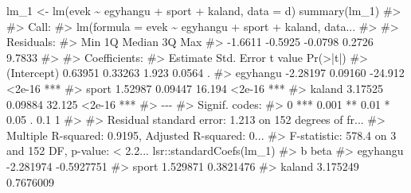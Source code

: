 \documentclass[
  letterpaper,
]{krantz}
\makeatletter
\newenvironment{Shaded}{\begin{snugshade}}{\end{snugshade}}
\newcommand{\AttributeTok}[1]{\textcolor[rgb]{0.40,0.45,0.13}{#1}}
\newcommand{\CommentTok}[1]{\textcolor[rgb]{0.37,0.37,0.37}{#1}}
\newcommand{\FunctionTok}[1]{\textcolor[rgb]{0.28,0.35,0.67}{#1}}
\newcommand{\NormalTok}[1]{\textcolor[rgb]{0.00,0.23,0.31}{#1}}
\newcommand{\OtherTok}[1]{\textcolor[rgb]{0.00,0.23,0.31}{#1}}
\newcommand{\SpecialCharTok}[1]{\textcolor[rgb]{0.37,0.37,0.37}{#1}}
\newenvironment{kframe}{%
\medskip{}
\setlength{\fboxsep}{.8em}
 \def\at@end@of@kframe{}%
 \ifinner\ifhmode%
  \def\at@end@of@kframe{\end{minipage}}%
  \begin{minipage}{\columnwidth}%
 \fi\fi%
 \def\FrameCommand##1{\hskip\@totalleftmargin \hskip-\fboxsep
 \colorbox{shadecolor}{##1}\hskip-\fboxsep
     \hskip-\linewidth \hskip-\@totalleftmargin \hskip\columnwidth}%
 \MakeFramed {\advance\hsize-\width
   \@totalleftmargin\z@ \linewidth\hsize
   \@setminipage}}%
 {\par\unskip\endMakeFramed%
 \at@end@of@kframe}
\renewenvironment{Shaded}{\begin{kframe}}{\end{kframe}}
\makeatother
\begin{document}
\begin{Shaded}
\begin{Highlighting}[]
\NormalTok{lm\_1 }\OtherTok{\textless{}{-}} \FunctionTok{lm}\NormalTok{(evek }\SpecialCharTok{\textasciitilde{}}\NormalTok{ egyhangu }\SpecialCharTok{+}\NormalTok{ sport }\SpecialCharTok{+}\NormalTok{ kaland, }\AttributeTok{data =}\NormalTok{ d)}
\FunctionTok{summary}\NormalTok{(lm\_1)}
\CommentTok{\#\textgreater{} }
\CommentTok{\#\textgreater{} Call:}
\CommentTok{\#\textgreater{} lm(formula = evek \textasciitilde{} egyhangu + sport + kaland, data...}
\CommentTok{\#\textgreater{} }
\CommentTok{\#\textgreater{} Residuals:}
\CommentTok{\#\textgreater{}     Min      1Q  Median      3Q     Max }
\CommentTok{\#\textgreater{} {-}1.6611 {-}0.5925 {-}0.0798  0.2726  9.7833 }
\CommentTok{\#\textgreater{} }
\CommentTok{\#\textgreater{} Coefficients:}
\CommentTok{\#\textgreater{}             Estimate Std. Error t value Pr(\textgreater{}|t|)    }
\CommentTok{\#\textgreater{} (Intercept)  0.63951    0.33263   1.923   0.0564 .  }
\CommentTok{\#\textgreater{} egyhangu    {-}2.28197    0.09160 {-}24.912   \textless{}2e{-}16 ***}
\CommentTok{\#\textgreater{} sport        1.52987    0.09447  16.194   \textless{}2e{-}16 ***}
\CommentTok{\#\textgreater{} kaland       3.17525    0.09884  32.125   \textless{}2e{-}16 ***}
\CommentTok{\#\textgreater{} {-}{-}{-}}
\CommentTok{\#\textgreater{} Signif. codes:  }
\CommentTok{\#\textgreater{} 0 \textquotesingle{}***\textquotesingle{} 0.001 \textquotesingle{}**\textquotesingle{} 0.01 \textquotesingle{}*\textquotesingle{} 0.05 \textquotesingle{}.\textquotesingle{} 0.1 \textquotesingle{} \textquotesingle{} 1}
\CommentTok{\#\textgreater{} }
\CommentTok{\#\textgreater{} Residual standard error: 1.213 on 152 degrees of fr...}
\CommentTok{\#\textgreater{} Multiple R{-}squared:  0.9195, Adjusted R{-}squared:  0...}
\CommentTok{\#\textgreater{} F{-}statistic: 578.4 on 3 and 152 DF,  p{-}value: \textless{} 2.2...}
\NormalTok{lsr}\SpecialCharTok{::}\FunctionTok{standardCoefs}\NormalTok{(lm\_1)}
\CommentTok{\#\textgreater{}                  b       beta}
\CommentTok{\#\textgreater{} egyhangu {-}2.281974 {-}0.5927751}
\CommentTok{\#\textgreater{} sport     1.529871  0.3821476}
\CommentTok{\#\textgreater{} kaland    3.175249  0.7676009}
\end{Highlighting}
\end{Shaded}
\end{document}
